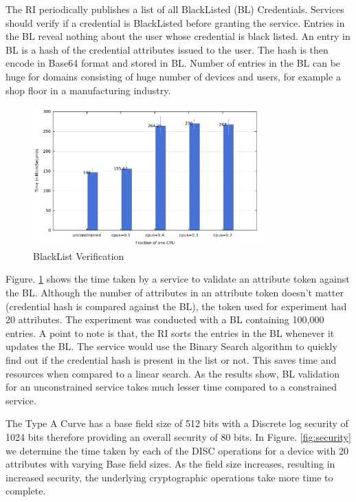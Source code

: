 \documentclass[journal]{IEEEtran}
\begin{document}
The RI periodically publishes a list of all BlackListed (BL) Credentials. Services should verify if a credential is BlackListed before granting the service. Entries in the BL reveal nothing about the user whose credential is black listed. An entry in BL is a hash of the credential attributes issued to the user. The hash is then encode in Base64 format and stored in BL. Number of entries in the BL can be huge for domains consisting of huge number of devices and users, for example a shop floor in a manufacturing industry.

\begin{figure}[htbp]
\centerline{\includegraphics[width=3.5in]{blacklist.pdf}}
\caption{BlackList Verification}
\label{fig:blacklist}
\end{figure}

Figure. \ref{fig:blacklist} shows the time taken by a service to validate an attribute token against the BL. Although the number of attributes in an attribute token doesn't matter (credential hash is compared against the BL), the token used for experiment had 20 attributes. The experiment was conducted with a BL containing 100,000 entries. A point to note is that, the RI sorts the entries in the BL whenever it updates the BL. The service would use the Binary Search algorithm to quickly find out if the credential hash is present in the list or not. This saves time and resources when compared to a linear search. As the results show, BL validation for an unconstrained service takes much lesser time compared to a constrained service.

The Type A Curve \cite{curve} has a base field size of 512 bits with a Discrete log security of 1024 bits  therefore providing an overall security of 80 bits. In Figure. \ref{fig:security} we determine the time taken by each of the DISC operations for a device with 20 attributes with varying Base field sizes. As the field size increases, resulting in increased security, the underlying cryptographic operations take more time to complete.
\end{document}
